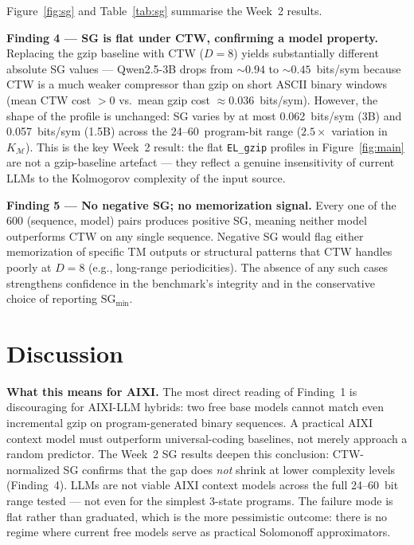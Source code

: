 \documentclass{article}
\begin{document}
Figure~\ref{fig:sg} and Table~\ref{tab:sg} summarise the Week~2 results.

\textbf{Finding 4 — SG is flat under CTW, confirming a model property.}
Replacing the gzip baseline with CTW ($D{=}8$) yields substantially different
absolute SG values — Qwen2.5-3B drops from $\sim 0.94$ to $\sim 0.45$~bits/sym
because CTW is a much weaker compressor than gzip on short ASCII binary windows
(mean CTW cost $> 0$ vs.\ mean gzip cost $\approx 0.036$~bits/sym).
However, the shape of the profile is unchanged: SG varies by at most
0.062~bits/sym (3B) and 0.057~bits/sym (1.5B) across the 24--60~program-bit
range ($2.5\times$ variation in $K_{\mathcal{M}}$).
This is the key Week~2 result: the flat \texttt{EL\_gzip} profiles in
Figure~\ref{fig:main} are not a gzip-baseline artefact — they reflect a genuine
insensitivity of current LLMs to the Kolmogorov complexity of the input source.

\textbf{Finding 5 — No negative SG; no memorization signal.}
Every one of the 600 (sequence, model) pairs produces positive SG, meaning
neither model outperforms CTW on any single sequence.
Negative SG would flag either memorization of specific TM outputs or structural
patterns that CTW handles poorly at $D{=}8$ (e.g., long-range periodicities).
The absence of any such cases strengthens confidence in the benchmark's
integrity and in the conservative choice of reporting $\text{SG}_{\min}$.

\section{Discussion}

\textbf{What this means for AIXI.}
The most direct reading of Finding~1 is discouraging for AIXI-LLM hybrids:
two free base models cannot match even incremental gzip on program-generated
binary sequences.
A practical AIXI context model must outperform universal-coding baselines,
not merely approach a random predictor.
The Week~2 SG results deepen this conclusion: CTW-normalized SG confirms that
the gap does \emph{not} shrink at lower complexity levels (Finding~4).
LLMs are not viable AIXI context models across the full 24--60~bit range
tested — not even for the simplest 3-state programs.
The failure mode is flat rather than graduated, which is the more pessimistic
outcome: there is no regime where current free models serve as practical
Solomonoff approximators.
\end{document}
